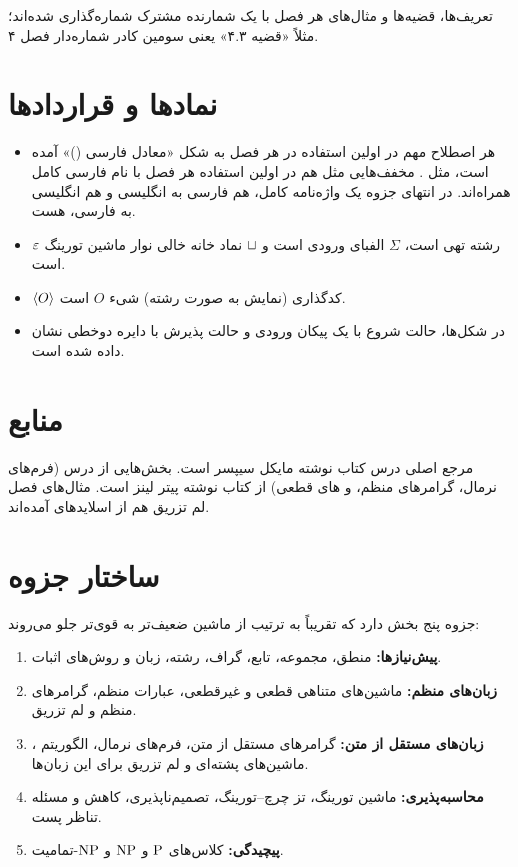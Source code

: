 تعریف‌ها، قضیه‌ها و مثال‌های هر فصل با یک شمارنده مشترک شماره‌گذاری شده‌اند؛ مثلاً «قضیه ۴.۳» یعنی سومین کادر شماره‌دار فصل ۴.

\section*{نمادها و قراردادها}
\begin{itemize}
\item هر اصطلاح مهم در اولین استفاده در هر فصل به شکل «معادل فارسی ()» آمده است، مثل . مخفف‌هایی مثل  هم در اولین استفاده هر فصل با نام فارسی کامل همراه‌اند. در انتهای جزوه یک واژه‌نامه کامل، هم فارسی به انگلیسی و هم انگلیسی به فارسی، هست.
\item $\varepsilon$ رشته تهی است، $\Sigma$ الفبای ورودی است و $\sqcup$ نماد خانه خالی نوار ماشین تورینگ است.
\item $\langle O\rangle$ کدگذاری (نمایش به صورت رشته) شیء $O$ است.
\item در شکل‌ها، حالت شروع با یک پیکان ورودی و حالت پذیرش با دایره دوخطی نشان داده شده است.
\end{itemize}

\section*{منابع}
مرجع اصلی درس کتاب  نوشته مایکل سیپسر است. بخش‌هایی از درس (فرم‌های نرمال، گرامرهای منظم،  و های قطعی) از کتاب  نوشته پیتر لینز است. مثال‌های فصل لم تزریق هم از اسلایدهای  آمده‌اند.

\section*{ساختار جزوه}
جزوه پنج بخش دارد که تقریباً به ترتیب از ماشین ضعیف‌تر به قوی‌تر جلو می‌روند:
\begin{enumerate}
\item \textbf{پیش‌نیازها:} منطق، مجموعه، تابع، گراف، رشته، زبان و روش‌های اثبات.
\item \textbf{زبان‌های منظم:} ماشین‌های متناهی قطعی و غیرقطعی، عبارات منظم، گرامرهای منظم و لم تزریق.
\item \textbf{زبان‌های مستقل از متن:} گرامرهای مستقل از متن، فرم‌های نرمال، الگوریتم ، ماشین‌های پشته‌ای و لم تزریق برای این زبان‌ها.
\item \textbf{محاسبه‌پذیری:} ماشین تورینگ، تز چرچ–تورینگ، تصمیم‌ناپذیری، کاهش و مسئله تناظر پست.
\item \textbf{پیچیدگی:} کلاس‌های $\mathrm{P}$ و $\mathrm{NP}$ و $\mathrm{NP}$-تمامیت.
\end{enumerate}
